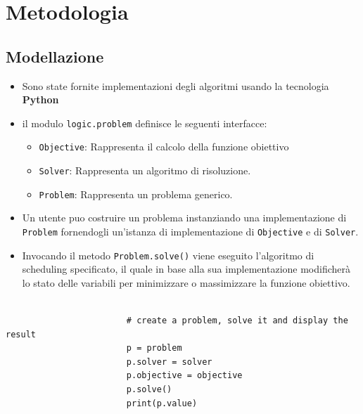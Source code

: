 \documentclass[compress]{beamer}
\begin{document}
\section{Metodologia}
    \subsection{Modellazione}
    
    \begin{frame}{\subsecname}

            \begin{itemize}
                \item Sono state fornite implementazioni degli algoritmi usando
                la tecnologia \textbf{Python}
                \item il modulo \texttt{logic.problem} definisce le seguenti interfacce:
                \begin{itemize}
                    \item \texttt{Objective}: Rappresenta il calcolo della funzione obiettivo
                    \item \texttt{Solver}: Rappresenta un algoritmo di risoluzione.
                    \item \texttt{Problem}: Rappresenta un problema generico.
                \end{itemize}
            \end{itemize}

    \end{frame}

    \begin{frame}[fragile]{\subsecname}
        \begin{itemize}
        \item Un utente puo costruire un problema instanziando una implementazione
        di \texttt{Problem} fornendogli un'istanza di implementazione di \texttt{Objective}
        e di \texttt{Solver}.
        \item Invocando il metodo \texttt{Problem.solve()} viene eseguito 
            l'algoritmo di scheduling specificato, il quale in base alla sua implementazione
            modificherà lo stato delle variabili per minimizzare o massimizzare la funzione obiettivo.    
        \end{itemize}    
            \scriptsize
                \begin{center}
                    \begin{verbatim}
                        
                        # create a problem, solve it and display the result
                        p = problem
                        p.solver = solver
                        p.objective = objective
                        p.solve()
                        print(p.value)
                    \end{verbatim}
                \end{center}        
    \end{frame}
\end{document}
